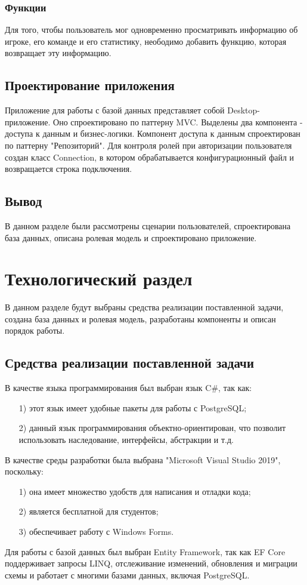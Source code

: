 \subsubsection{Функции}
Для того, чтобы пользователь мог одновременно просматривать информацию об игроке, его команде и его статистику, неободимо добавить функцию, которая возвращает эту информацию.

\subsection{Проектирование приложения}
Приложение для работы с базой данных представляет собой Desktop-приложение. Оно спроектировано по паттерну MVC. Выделены два компонента - доступа к данным и бизнес-логики. Компонент доступа к данным спроектирован по паттерну "Репозиторий". Для контроля ролей при авторизации пользователя создан класс Connection, в котором обрабатывается конфигурационный файл и возвращается строка подключения. 
\subsection{Вывод}
В данном разделе были рассмотрены сценарии пользователей, спроектирована база данных, описана ролевая модель и спроектировано приложение.

\newpage
\section{Технологический раздел}
В данном разделе будут выбраны средства реализации поставленной задачи, создана база данных и ролевая модель, разработаны компоненты и описан порядок работы.
\subsection{Средства реализации поставленной задачи}
В качестве языка программирования был выбран язык C\#\cite{sharp}, так как:
\begin{itemize}
	\item[1)] этот язык имеет удобные пакеты для работы с PostgreSQL;
	\item[2)] данный язык программирования объектно-ориентирован, что позволит использовать наследование, интерфейсы, абстракции и т.д.
\end{itemize}
В качестве среды разработки была выбрана "Microsoft Visual Studio 2019"\cite{vs}, поскольку:
\begin{itemize}
	\item[1)] она имеет множество удобств для написания и отладки кода;
	\item[2)] является бесплатной для студентов;
	\item[3)] обеспечивает работу с Windows Forms\cite{wf}.  
\end{itemize}
Для работы с базой данных был выбран Entity Framework\cite{efcore}, так как EF Core поддерживает запросы LINQ, отслеживание изменений, обновления и миграции схемы и работает с многими базами данных, включая PostgreSQL.
